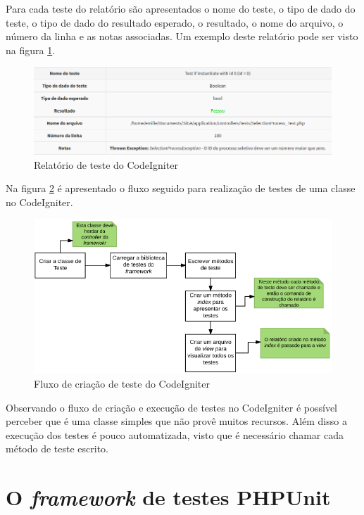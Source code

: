 Para cada teste do relatório são apresentados o nome do teste, o tipo de dado do teste, o tipo de 
dado do resultado esperado, o resultado, o nome do arquivo, o número da linha e as notas associadas.
Um exemplo deste relatório pode ser visto na figura \ref{fig:relatorio_codeigniter}.

\begin{figure}[!h]
\centering
\includegraphics[scale=0.7]{figuras/relatorio_codeigniter.png}
\caption{Relatório de teste do CodeIgniter}
\label{fig:relatorio_codeigniter}
\end{figure}

Na figura \ref{fig:fluxo_codeigniter} é apresentado o fluxo seguido para realização de testes de uma classe no CodeIgniter.

\begin{figure}[!h]
\centering
\includegraphics[scale=0.7]{figuras/fluxo_codeigniter.png}
\caption{Fluxo de criação de teste do CodeIgniter}
\label{fig:fluxo_codeigniter}
\end{figure}

Observando o fluxo de criação e execução de testes no CodeIgniter é possível perceber que é uma classe simples que não provê muitos recursos. Além disso a execução dos testes é pouco automatizada, visto que é necessário chamar cada método
de teste escrito. 

\vfill
\pagebreak


\section{O \textit{framework} de testes PHPUnit}


